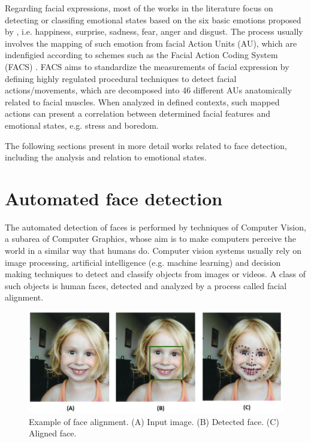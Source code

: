 Regarding facial expressions, most of the works in the literature focus on detecting or classifing emotional states based on the six basic emotions proposed by \textcite{ekman1971constants}, i.e. happiness, surprise, sadness, fear, anger and disgust. The process usually involves the mapping of such emotion from facial Action Units (AU), which are indenfigied according to schemes such as the Facial Action Coding System (FACS) \parencite{ekman1977facial,cohn2007observer}. FACS aims to standardize the measurements of facial expression by defining highly regulated procedural techniques to detect facial actions/movements, which are decomposed into 46 different AUs anatomically related to facial muscles. When analyzed in defined contexts, such mapped actions can present a correlation between determined facial features and emotional states, e.g. stress and boredom.

The following sections present in more detail works related to face detection, including the analysis and relation to emotional states.

\section{Automated face detection}
The automated detection of faces is performed by techniques of Computer Vision, a subarea of Computer Graphics, whose aim is to make computers perceive the world in a similar way that humans do. Computer vision systems usually rely on image processing, artificial intelligence (e.g. machine learning) and decision making techniques to detect and classify objects from images or videos. A class of such objects is human faces, detected and analyzed by a process called facial alignment.

\begin{figure}[h]
    \centering
    \includegraphics[width=\linewidth]{figures/face_alignment.jpg}
    \caption{Example of face alignment. (A) Input image. (B) Detected face. (C) Aligned face.}
    \label{fig:alignment}
\end{figure}


